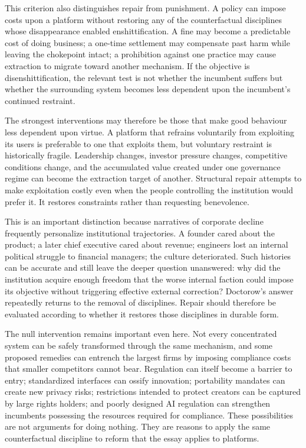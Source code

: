 \documentclass[11pt]{article}
\begin{document}
This criterion also distinguishes repair from punishment. A policy can impose costs upon a platform without restoring any of the counterfactual disciplines whose disappearance enabled enshittification. A fine may become a predictable cost of doing business; a one-time settlement may compensate past harm while leaving the chokepoint intact; a prohibition against one practice may cause extraction to migrate toward another mechanism. If the objective is disenshittification, the relevant test is not whether the incumbent suffers but whether the surrounding system becomes less dependent upon the incumbent's continued restraint.

The strongest interventions may therefore be those that make good behaviour less dependent upon virtue. A platform that refrains voluntarily from exploiting its users is preferable to one that exploits them, but voluntary restraint is historically fragile. Leadership changes, investor pressure changes, competitive conditions change, and the accumulated value created under one governance regime can become the extraction target of another. Structural repair attempts to make exploitation costly even when the people controlling the institution would prefer it. It restores constraints rather than requesting benevolence.

This is an important distinction because narratives of corporate decline frequently personalize institutional trajectories. A founder cared about the product; a later chief executive cared about revenue; engineers lost an internal political struggle to financial managers; the culture deteriorated. Such histories can be accurate and still leave the deeper question unanswered: why did the institution acquire enough freedom that the worse internal faction could impose its objective without triggering effective external correction? Doctorow's answer repeatedly returns to the removal of disciplines. Repair should therefore be evaluated according to whether it restores those disciplines in durable form.

The null intervention remains important even here. Not every concentrated system can be safely transformed through the same mechanism, and some proposed remedies can entrench the largest firms by imposing compliance costs that smaller competitors cannot bear. Regulation can itself become a barrier to entry; standardized interfaces can ossify innovation; portability mandates can create new privacy risks; restrictions intended to protect creators can be captured by large rights holders; and poorly designed AI regulation can strengthen incumbents possessing the resources required for compliance. These possibilities are not arguments for doing nothing. They are reasons to apply the same counterfactual discipline to reform that the essay applies to platforms.
\end{document}
